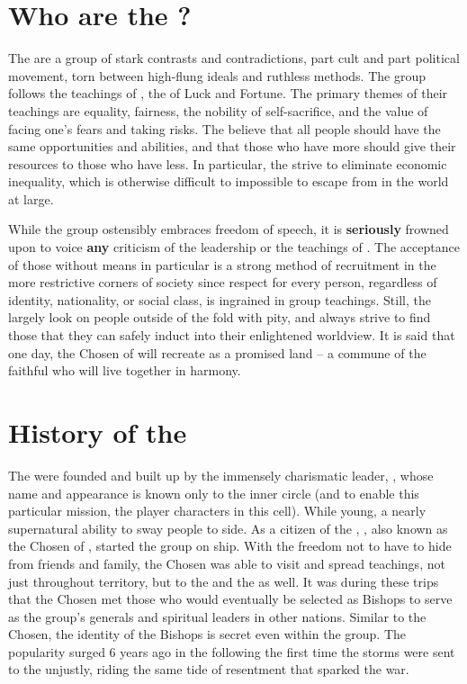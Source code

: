 \documentclass[blue]{GL2020}
\begin{document}
\name{\bCult{}}

\section*{Who are the \pGoaties{}?}
The \pGoaties{} are a group of stark contrasts and contradictions, part cult and part political movement, torn between high-flung ideals and ruthless methods. The group follows the teachings of \cGenesis{}, the \cGenesis{\Deity} of Luck and Fortune. The primary themes of their teachings are equality, fairness, the nobility of self-sacrifice, and the value of facing one's fears and taking risks. The \pGoaties{} believe that all people should have the same opportunities and abilities, and that those who have more should give their resources to those who have less. In particular, the \pGoaties{} strive to eliminate economic inequality, which is otherwise difficult to impossible to escape from in the world at large.

While the group ostensibly embraces freedom of speech, it is \textbf{seriously} frowned upon to voice \textbf{any} criticism of the leadership or the teachings of \cGenesis{}. The acceptance of those without means in particular is a strong method of recruitment in the more restrictive corners of society since respect for every person, regardless of identity, nationality, or social class, is ingrained in group teachings. Still, the \pGoaties{} largely look on people outside of the fold with pity, and always strive to find those that they can safely induct into their enlightened worldview. It is said that one day, the Chosen of \cGenesis{} will recreate \pEarth{} as a promised land -- a commune of the faithful who will live together in harmony.

\section*{History of the \pGoaties{}}
The \pGoaties{} were founded and built up by the immensely charismatic leader, \cChupLeader{\full}, whose name and appearance is known only to the inner circle (and to enable this particular mission, the player characters in this cell). While young, \cChupLeader{\they} \cChupLeader{\have} a nearly supernatural ability to sway people to \cChupLeader{\their} side. As a citizen of the \pShip{}, \cChupLeader{}, also known as the Chosen of \cGenesis{}, started the group on \cChupLeader{\their} ship. With the freedom not to have to hide from friends and family, the Chosen was able to visit and spread \cChupLeader{\their} teachings, not just throughout \pShippie{} territory, but to the \pTech{} and the \pFarm{} as well. It was during these trips that the Chosen met those who would eventually be selected as Bishops to serve as the group's generals and spiritual leaders in other nations. Similar to the Chosen, the identity of the Bishops is secret even within the group. The \pGoaties{} popularity surged 6 years ago in the \pShip{} following the first time the storms were sent to the \pShip{} unjustly, riding the same tide of resentment that sparked the war.
\end{document}
